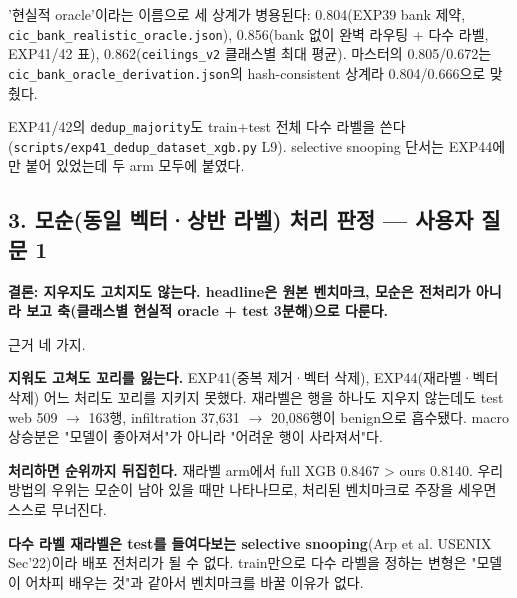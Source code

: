 \par\noindent \textbullet\enspace '현실적 oracle'이라는 이름으로 세 상계가 병용된다: 0.804(EXP39 bank 제약, \texttt{cic\_\allowbreak{}\allowbreak{}bank\allowbreak{}\_\allowbreak{}\allowbreak{}realist\allowbreak{}ic\_\allowbreak{}\allowbreak{}oracl\allowbreak{}e.\allowbreak{}json}), 0.856(bank 없이 완벽 라우팅 +\allowbreak{} 다수 라벨, EXP41/\allowbreak{}42 표), 0.862(\texttt{ceilings\allowbreak{}\_\allowbreak{}\allowbreak{}v2} 클래스별 최대 평균). 마스터의 0.805/\allowbreak{}0.672는 \texttt{cic\_\allowbreak{}\allowbreak{}bank\allowbreak{}\_\allowbreak{}\allowbreak{}oracle\_\allowbreak{}\allowbreak{}derivati\allowbreak{}on.\allowbreak{}json}의 hash-consistent 상계라 0.804/\allowbreak{}0.666으로 맞췄다.


\par\noindent \textbullet\enspace EXP41/\allowbreak{}42의 \texttt{dedup\_\allowbreak{}\allowbreak{}ma\allowbreak{}jority}도 train+\allowbreak{}test 전체 다수 라벨을 쓴다(\texttt{scripts/\allowbreak{}\allowbreak{}exp41\_\allowbreak{}\allowbreak{}de\allowbreak{}dup\_\allowbreak{}\allowbreak{}data\allowbreak{}set\_\allowbreak{}\allowbreak{}xgb.\allowbreak{}py} L9). selective snooping 단서는 EXP44에만 붙어 있었는데 두 arm 모두에 붙였다.


\subsection{3. 모순(동일 벡터·상반 라벨) 처리 판정 — 사용자 질문 1}
\textbf{결론: 지우지도 고치지도 않는다. headline은 원본 벤치마크, 모순은 전처리가 아니라 보고 축(클래스별 현실적 oracle +\allowbreak{} test 3분해)으로 다룬다.}

근거 네 가지.

\par\noindent \textbullet\enspace \textbf{지워도 고쳐도 꼬리를 잃는다.} EXP41(중복 제거·벡터 삭제), EXP44(재라벨·벡터 삭제) 어느 처리도 꼬리를 지키지 못했다. 재라벨은 행을 하나도 지우지 않는데도 test web 509 \ensuremath{\rightarrow} 163행, infiltration 37,631 \ensuremath{\rightarrow} 20,086행이 benign으로 흡수됐다. macro 상승분은 "모델이 좋아져서"가 아니라 "어려운 행이 사라져서"다.


\par\noindent \textbullet\enspace \textbf{처리하면 순위까지 뒤집힌다.} 재라벨 arm에서 full XGB 0.8467 > ours 0.8140. 우리 방법의 우위는 모순이 남아 있을 때만 나타나므로, 처리된 벤치마크로 주장을 세우면 스스로 무너진다.


\par\noindent \textbullet\enspace \textbf{다수 라벨 재라벨은 test를 들여다보는 selective snooping}(Arp et al. USENIX Sec'22)이라 배포 전처리가 될 수 없다. train만으로 다수 라벨을 정하는 변형은 "모델이 어차피 배우는 것"과 같아서 벤치마크를 바꿀 이유가 없다.


